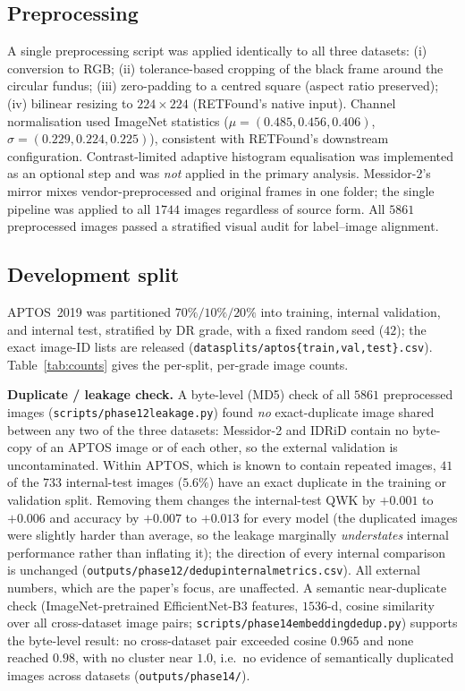 \documentclass[journal]{IEEEtran}
\renewcommand{\_}{\origunderscore\allowbreak}
\begin{document}
\subsection{Preprocessing}
\label{sec:methods-pre}

A single preprocessing script was applied identically to all three datasets:
(i) conversion to RGB; (ii) tolerance-based cropping of the black frame around the
circular fundus; (iii) zero-padding to a centred square (aspect ratio preserved);
(iv) bilinear resizing to $224\times224$ (RETFound's native input). Channel
normalisation used ImageNet statistics
($\mu=(0.485,0.456,0.406)$, $\sigma=(0.229,0.224,0.225)$), consistent with
RETFound's downstream configuration. Contrast-limited adaptive histogram
equalisation was implemented as an optional step and was \emph{not} applied in the
primary analysis. Messidor-2's mirror mixes vendor-preprocessed and original
frames in one folder; the single pipeline was applied to all $1744$ images
regardless of source form. All $5861$ preprocessed images passed a stratified
visual audit for label--image alignment.

\subsection{Development split}
\label{sec:methods-split}

APTOS~2019 was partitioned $70\%/10\%/20\%$ into training, internal validation,
and internal test, stratified by DR grade, with a fixed random seed ($42$); the
exact image-ID lists are released
(\texttt{data\_splits/\allowbreak{}aptos\_\{train,val,test\}.csv}). Table~\ref{tab:counts}
gives the per-split, per-grade image counts.

\textbf{Duplicate / leakage check.} A byte-level (MD5) check of all $5861$
preprocessed images (\texttt{scripts/\allowbreak{}phase12\_leakage.py}) found \emph{no}
exact-duplicate image shared between any two of the three datasets: Messidor-2 and
IDRiD contain no byte-copy of an APTOS image or of each other, so the external
validation is uncontaminated. Within APTOS, which is known to contain repeated
images, $41$ of the $733$ internal-test images ($5.6\%$) have an exact duplicate
in the training or validation split. Removing them changes the internal-test QWK
by $+0.001$ to $+0.006$ and accuracy by $+0.007$ to $+0.013$ for every model (the
duplicated images were slightly harder than average, so the leakage marginally
\emph{understates} internal performance rather than inflating it); the direction
of every internal comparison is unchanged
(\texttt{outputs/\allowbreak{}phase12/\allowbreak{}dedup\_internal\_metrics.csv}). All external numbers,
which are the paper's focus, are unaffected. A semantic near-duplicate check
(ImageNet-pretrained EfficientNet-B3 features, $1536$-d, cosine similarity over
all cross-dataset image pairs; \texttt{scripts/\allowbreak{}phase14\_embedding\_dedup.py})
supports the byte-level result: no cross-dataset pair exceeded cosine $0.965$ and
none reached $0.98$, with no cluster near $1.0$, i.e.\ no evidence of
semantically duplicated images across datasets
(\texttt{outputs/\allowbreak{}phase14/\allowbreak{}}).
\end{document}
